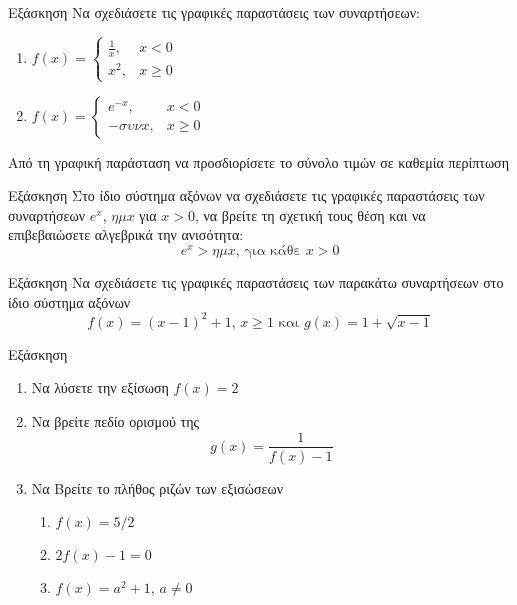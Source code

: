 \documentclass[greek]{beamer}
\begin{document}
\begin{frame}{Εξάσκηση}
 Να σχεδιάσετε τις γραφικές παραστάσεις των συναρτήσεων:
 \begin{enumerate}
  \item<1->
        $f(x)=
         \begin{cases}
          \frac{1}{x}, & x<0    \\
          x^2,         & x\ge 0
         \end{cases}$

  \item<2-> $f(x)=
         \begin{cases}
          e^{-x}, & x<0    \\
          -συν x, & x\ge 0
         \end{cases}$
 \end{enumerate}
 Από τη γραφική παράσταση να προσδιορίσετε το σύνολο τιμών σε καθεμία περίπτωση
\end{frame}

\begin{frame}{Εξάσκηση}
 Στο ίδιο σύστημα αξόνων να σχεδιάσετε τις γραφικές παραστάσεις των συναρτήσεων $e^x$, $ημ x$ για $x>0$, να βρείτε τη σχετική τους θέση και να επιβεβαιώσετε αλγεβρικά την ανισότητα:
 $$e^x>ημ x \text{, για κάθε } x>0$$
\end{frame}

\begin{frame}{Εξάσκηση}
 Να σχεδιάσετε τις γραφικές παραστάσεις των παρακάτω συναρτήσεων στο ίδιο σύστημα αξόνων
 $$f(x)=(x-1)^2+1\text{, } x\ge 1 \text{ και } g(x)=1+\sqrt{x-1}$$
\end{frame}

\begin{frame}{Εξάσκηση}
 \href{https://www.geogebra.org/m/euy2uhma}{}
 \begin{enumerate}
  \item<1-> Να λύσετε την εξίσωση $f(x)=2$
  \item<2-> Να βρείτε πεδίο ορισμού της $$g(x)=\frac{1}{f(x)-1}$$
  \item<3-> Να Βρείτε το πλήθος ριζών των εξισώσεων
        \begin{enumerate}
         \item<4-> $f(x)=5/2$
         \item<5-> $2f(x)-1=0$
         \item<6-> $f(x)=a^2+1$, $a\ne 0$
        \end{enumerate}
 \end{enumerate}
\end{frame}
\end{document}
